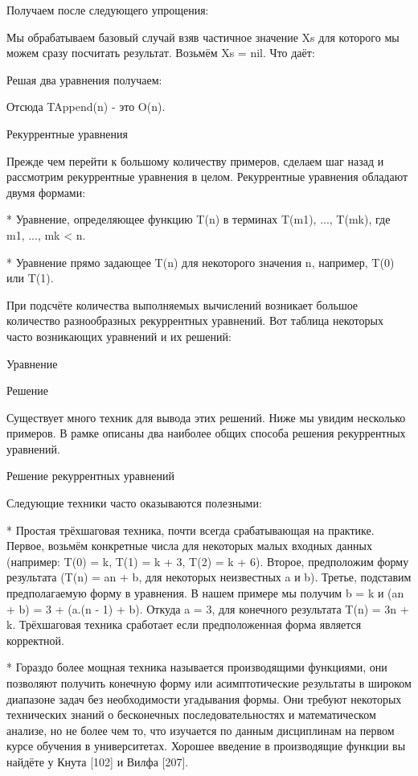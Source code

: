 Получаем после следующего упрощения:

Мы обрабатываем базовый случай взяв частичное значение Xs для которого мы можем сразу посчитать результат. Возьмём Xs = nil. Что даёт:

Решая два уравнения получаем:

Отсюда TAppend(n) - это O(n).

Рекуррентные уравнения

Прежде чем перейти к большому количеству примеров, сделаем шаг назад и рассмотрим рекуррентные уравнения в целом. Рекуррентные уравнения обладают двумя формами:

* Уравнение, определяющее функцию T(n) в терминах T(m1), ..., T(mk), где m1, ..., mk < n.

* Уравнение прямо задающее T(n) для некоторого значения n, например, T(0) или T(1).

При подсчёте количества выполняемых вычислений возникает большое количество разнообразных рекуррентных уравнений. Вот таблица некоторых часто возникающих уравнений и их решений:

Уравнение

Решение

Существует много техник для вывода этих решений. Ниже мы увидим несколько примеров. В рамке описаны два наиболее общих способа решения рекуррентных уравнений.

Решение рекуррентных уравнений

Следующие техники часто оказываются полезными:

* Простая трёхшаговая техника, почти всегда срабатывающая на практике. Первое, возьмём конкретные числа для некоторых малых входных данных (например: T(0) = k, T(1) = k + 3, T(2) = k + 6). Второе, предположим форму результата (T(n) = an + b, для некоторых неизвестных a и b). Третье, подставим предполагаемую форму в уравнения. В нашем примере мы получим b = k и (an + b) = 3 + (a.(n - 1) + b). Откуда a = 3, для конечного результата T(n) = 3n + k. Трёхшаговая техника сработает если предположенная форма является корректной.

* Гораздо более мощная техника называется производящими функциями, они позволяют получить конечную форму или асимптотические результаты в широком диапазоне задач без необходимости угадывания формы. Они требуют некоторых технических знаний о бесконечных последовательностях и математическом анализе, но не более чем то, что изучается по данным дисциплинам на первом курсе обучения в университетах. Хорошее введение в производящие функции вы найдёте у Кнута [102] и Вилфа [207].

